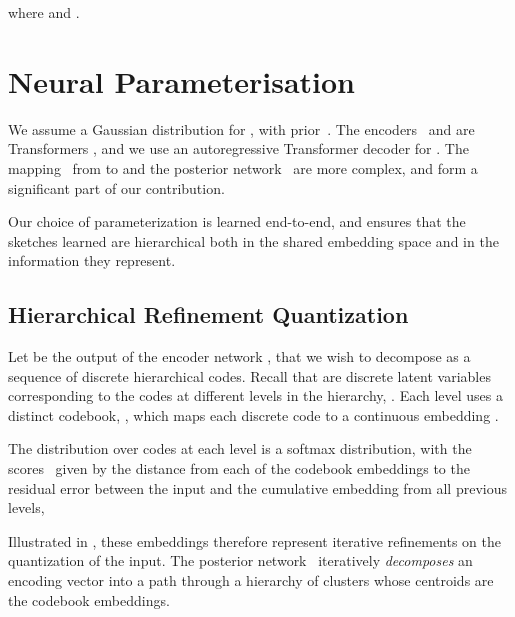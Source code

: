 \documentclass[11pt]{article}
\begin{document}
where  and .



















\section{Neural Parameterisation}




We assume a Gaussian distribution for , with prior~. The encoders~ and  are Transformers \cite{Vaswani2017}, and we use an autoregressive Transformer decoder for . The mapping~ from  to  and the posterior network~ are more complex, and form a significant part of our contribution.

Our choice of parameterization is learned end-to-end, and ensures that the sketches learned are hierarchical both in the shared embedding space and in the information they represent. 

\subsection{Hierarchical Refinement Quantization}










Let  be the output of the encoder network , that we wish to decompose as a sequence of discrete hierarchical codes. Recall that  are discrete latent variables corresponding to the codes at different levels in the hierarchy, .
Each level uses a distinct codebook, , which maps each discrete code to a continuous embedding .


 The distribution over codes at each level is a softmax distribution, with the scores~ given by the distance from each of the codebook embeddings to the residual error between the input and the cumulative embedding from all previous levels, 

Illustrated in , these embeddings therefore represent iterative refinements on the quantization of the input. The posterior network~ iteratively \textit{decomposes} an encoding vector into a path through a hierarchy of clusters whose centroids are the codebook embeddings.
\end{document}
